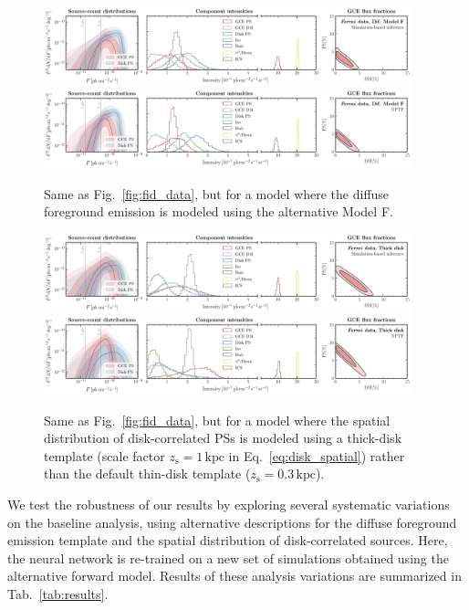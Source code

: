 \documentclass[prd,aps,10pt,nofootinbib,twocolumn,superscriptaddress,preprintnumbers,balancelastpage,longbibliography]{revtex4-1}
\begin{document}
%
\begin{figure}
\centering
\includegraphics[width=0.95\textwidth]{plots/data_fid_sbi_modelF.pdf}
\includegraphics[width=0.95\textwidth]{plots/data_fid_nptf_modelF.pdf}
\caption{Same as Fig.~\ref{fig:fid_data}, but for a model where the diffuse foreground emission is modeled using the alternative Model F.}
\label{fig:fid_data_modelF}
\end{figure}
%

%
\begin{figure}
\centering
\includegraphics[width=0.95\textwidth]{plots/data_fid_sbi_thick.pdf}
\includegraphics[width=0.95\textwidth]{plots/data_fid_nptf_thick.pdf}
\caption{Same as Fig.~\ref{fig:fid_data}, but for a model where the spatial distribution of disk-correlated PSs is modeled using a thick-disk template (scale factor $z_\mathrm{s}=1\,\mathrm{kpc}$ in Eq.~\eqref{eq:disk_spatial}) rather than the default thin-disk template ($z_\mathrm{s}=0.3\,\mathrm{kpc}$).}
\label{fig:fid_data_thick_disk}
\end{figure}
%

We test the robustness of our results by exploring several systematic variations on the baseline analysis, using alternative descriptions for the diffuse foreground emission template and the spatial distribution of disk-correlated sources. Here, the neural network is re-trained on a new set of simulations obtained using the alternative forward model. Results of these analysis variations are summarized in Tab.~\ref{tab:results}. \\
\end{document}
